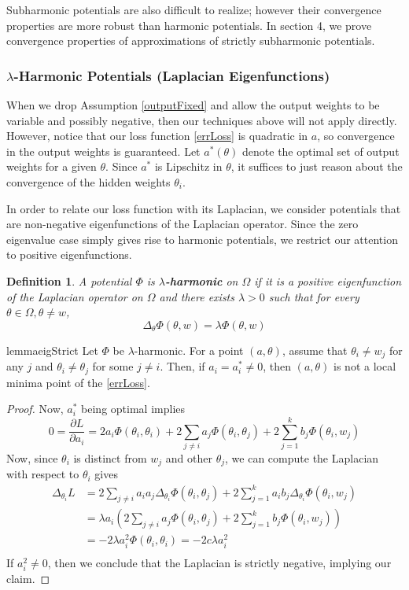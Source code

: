 \documentclass{article}
\newtheorem{definition}[theorem]{Definition}
\newcommand{\pd}[2]{\frac{\partial#1}{\partial#2}}
\begin{document}
Subharmonic potentials are also difficult to realize; however their convergence properties are more robust than harmonic potentials. In section 4, we prove convergence properties of approximations of strictly subharmonic potentials.


\subsubsection{$\lambda$-Harmonic Potentials (Laplacian Eigenfunctions)}

When we drop Assumption \ref{outputFixed} and allow the output weights to be variable and possibly negative, then our techniques above will not apply directly. However, notice that our loss function \eqref{errLoss} is quadratic in $a$, so convergence in the output weights is guaranteed. Let $a^*(\theta)$ denote the optimal set of output weights for a given $\theta$. Since $a^*$ is Lipschitz in $\theta$, it suffices to just reason about the convergence of the hidden weights $\theta_i$.

In order to relate our loss function with its Laplacian, we consider potentials that are non-negative eigenfunctions of the Laplacian operator. Since the zero eigenvalue case simply gives rise to harmonic potentials, we restrict our attention to positive eigenfunctions.

\begin{definition}
A potential $\Phi$ is {\bf$\lambda$-harmonic} on $\Omega$ if it is a positive eigenfunction of the Laplacian operator on $\Omega$ and there exists $\lambda > 0$ such that for every $\theta \in \Omega, \theta \neq w$,
\[\Delta_\theta \Phi(\theta, w) = \lambda \Phi(\theta,w) \]
\end{definition}

\begin{restatable}{lemma}{eigStrict}
\label{EigStrict}
Let $\Phi$ be $\lambda$-harmonic. For a point $(a,\theta)$, assume that $\theta_i \neq w_j$ for any $j$ and $\theta_i \neq \theta_j$ for some $j \neq i$. Then, if $a_i = a^*_i\neq 0$, then $(a,\theta)$ is not a local minima point of the \eqref{errLoss}.
\end{restatable}
\begin{proof}
Now, $a_i^*$ being optimal implies
\[0 = \pd{L}{a_i} = 2a_i \Phi(\theta_i,\theta_i) + 2\sum_{j\neq i} a_j \Phi(\theta_i,\theta_j) + 2\sum_{j=1}^k b_j \Phi(\theta_i,w_j)\]
Now, since $\theta_i$ is distinct from $w_j$ and other $\theta_j$, we can compute the Laplacian with respect to $\theta_i$ gives
\begin{align*}
\Delta_{\theta_i}L &= 2\sum_{j\neq i} a_i a_j \Delta_{\theta_i}\Phi(\theta_i,\theta_j) + 2\sum_{j=1}^k a_i b_j \Delta_{\theta_i}\Phi(\theta_i,w_j) \\
&= \lambda a_i\left(2\sum_{j\neq i} a_j \Phi(\theta_i,\theta_j) + 2\sum_{j=1}^k  b_j \Phi(\theta_i,w_j)\right) \\
&= -2\lambda a_i^2\Phi(\theta_i,\theta_i) = -2c \lambda a_i^2\\
\end{align*}
If $a_i^2 \neq 0$, then we conclude that the Laplacian is strictly negative, implying our claim.
\end{proof}
\end{document}
